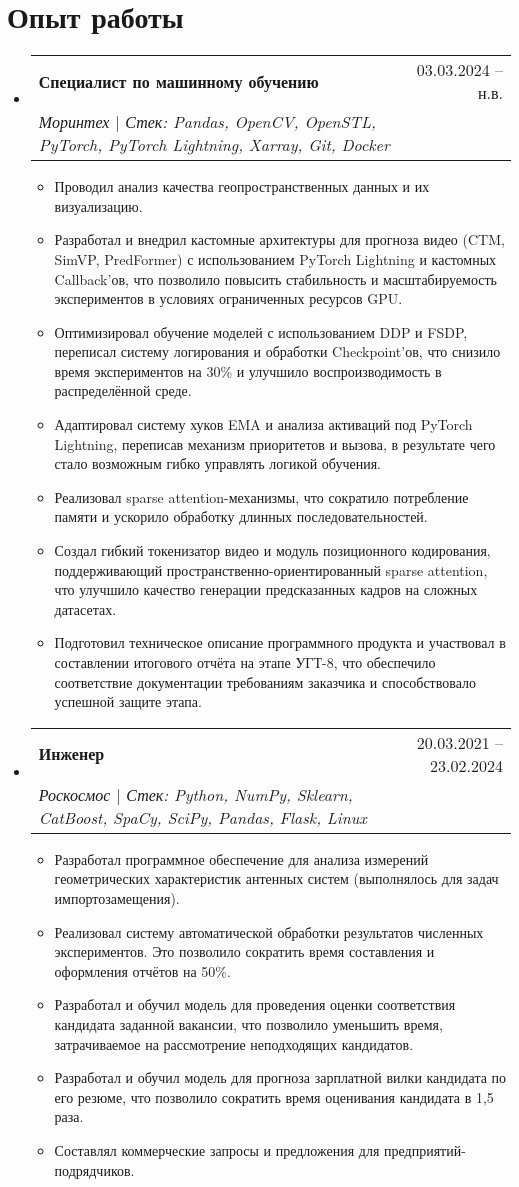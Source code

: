 \documentclass[letterpaper,11pt]{article}
\makeatletter
\newcommand{\resumeItem}[1]{
  \item\small{
    {#1 \vspace{-2pt}}
  }
}
\newcommand{\resumeSubheading}[4]{
  \vspace{-2pt}\item
    \begin{tabular*}{0.97\textwidth}[t]{l@{\extracolsep{\fill}}r}
      \textbf{#1} & #2 \\
      \textit{\small#3} & \textit{\small #4} \\
    \end{tabular*}\vspace{-7pt}
}
\newcommand{\resumeSubHeadingListStart}{\begin{itemize}[leftmargin=0.15in, label={}]}
\newcommand{\resumeSubHeadingListEnd}{\end{itemize}}
\newcommand{\resumeItemListStart}{\begin{itemize}}
\newcommand{\resumeItemListEnd}{\end{itemize}\vspace{-5pt}}
\makeatother
\begin{document}
\section{Опыт работы}
  \resumeSubHeadingListStart

    \resumeSubheading
      {Специалист по машинному обучению }{03.03.2024 -- н.в.}
      {Моринтех $|$ Стек: Pandas, OpenCV, OpenSTL, PyTorch, PyTorch Lightning, Xarray, Git, Docker }{}
      \resumeItemListStart
        \resumeItem{ Проводил анализ качества геопространственных данных и их визуализацию. }
        \resumeItem{ Разработал и внедрил кастомные архитектуры для прогноза видео (CTM, SimVP, PredFormer) с использованием PyTorch Lightning и кастомных Callback’ов, что позволило повысить стабильность и масштабируемость экспериментов в условиях ограниченных ресурсов GPU. }
        \resumeItem{Оптимизировал обучение моделей с использованием DDP и FSDP, переписал систему логирования и обработки Checkpoint’ов, что снизило время экспериментов на 30\% и улучшило воспроизводимость в распределённой среде.}
        \resumeItem{Адаптировал систему хуков EMA и анализа активаций под PyTorch Lightning, переписав механизм приоритетов и вызова, в результате чего стало возможным гибко управлять логикой обучения.}
        \resumeItem{Реализовал sparse attention-механизмы, что сократило потребление памяти и ускорило обработку длинных последовательностей.}
        \resumeItem{Создал гибкий токенизатор видео и модуль позиционного кодирования, поддерживающий пространственно-ориентированный sparse attention, что улучшило качество генерации предсказанных кадров на сложных датасетах.}
        \resumeItem{Подготовил техническое описание программного продукта и участвовал в составлении итогового отчёта на этапе УГТ-8, что обеспечило соответствие документации требованиям заказчика и способствовало успешной защите этапа.}
      \resumeItemListEnd


    \resumeSubheading
      {Инженер}{20.03.2021 -- 23.02.2024}
      {Роскосмос $|$ Стек: Python, NumPy, Sklearn, CatBoost, SpaCy, SciPy, Pandas, Flask, Linux}{}
      \resumeItemListStart
        \resumeItem{Разработал программное обеспечение для анализа измерений геометрических характеристик антенных систем (выполнялось для задач импортозамещения).}
        \resumeItem{ Реализовал систему автоматической обработки результатов численных экспериментов. Это позволило  сократить время составления и оформления отчётов на 50\%.}
        \resumeItem{ Разработал и обучил модель для проведения оценки соответствия кандидата заданной вакансии, что позволило уменьшить время, затрачиваемое на рассмотрение неподходящих кандидатов. }
        \resumeItem{ Разработал и обучил модель для прогноза зарплатной вилки кандидата по его резюме, что позволило сократить время оценивания кандидата в 1,5 раза. }
        \resumeItem{Составлял коммерческие запросы и предложения для предприятий-подрядчиков.}
      \resumeItemListEnd
  \resumeSubHeadingListEnd
\end{document}
